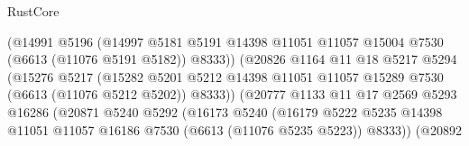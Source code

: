 \begin{lexlean}{RustCore}
\begin{coremodule}
                                    (@14991
                                      @5196
                                      (@14997
                                        @5181
                                        @5191
                                        @14398
                                        @11051
                                        @11057
                                        @15004
                                        @7530
                                        (@6613 (@11076 @5191 @5182))
                                        @8333))
                                    (@20826
                                      @1164
                                      @11
                                      @18
                                      @5217
                                      @5294
                                      (@15276
                                        @5217
                                        (@15282
                                          @5201
                                          @5212
                                          @14398
                                          @11051
                                          @11057
                                          @15289
                                          @7530
                                          (@6613 (@11076 @5212 @5202))
                                          @8333))
                                      (@20777
                                        @1133
                                        @11
                                        @17
                                        @2569
                                        @5293
                                        @16286
                                        (@20871
                                          @5240
                                          @5292
                                          (@16173
                                            @5240
                                            (@16179
                                              @5222
                                              @5235
                                              @14398
                                              @11051
                                              @11057
                                              @16186
                                              @7530
                                              (@6613 (@11076 @5235 @5223))
                                              @8333))
                                          (@20892

\end{coremodule}
\end{lexlean}
